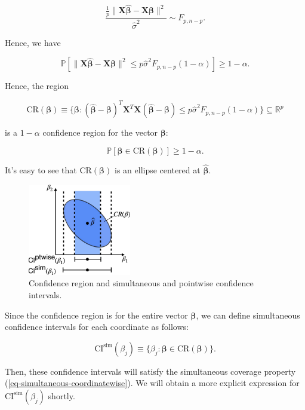 \documentclass[
  11pt,
  letterpaper,
  oneside]{book}
\theoremstyle{definition}
\theoremstyle{plain}
\theoremstyle{plain}
\theoremstyle{plain}
\theoremstyle{remark}
\begin{document}
\[
\frac{\frac{1}{p}\|\boldsymbol{X} \boldsymbol{\widehat{\beta}} - \boldsymbol{X} \boldsymbol{\beta}\|^2}{\widehat{\sigma}^2} \sim F_{p, n-p}.
\]

Hence, we have

\[
\mathbb{P}[\|\boldsymbol{X} \boldsymbol{\widehat{\beta}} - \boldsymbol{X} \boldsymbol{\beta}\|^2 \leq p \widehat{\sigma}^2 F_{p, n-p}(1-\alpha)] \geq 1-\alpha.
\]

Hence, the region

\[
\text{CR}(\boldsymbol{\beta}) \equiv \{\boldsymbol{\beta}: (\boldsymbol{\widehat{\beta}} - \boldsymbol{\beta})^T \boldsymbol{X}^T \boldsymbol{X} (\boldsymbol{\widehat{\beta}} - \boldsymbol{\beta})  \leq p \widehat{\sigma}^2 F_{p, n-p}(1-\alpha)\} \subseteq \mathbb{R}^p
\]

is a \(1-\alpha\) confidence region for the vector
\(\boldsymbol{\beta}\):

\[
\mathbb{P}[\boldsymbol{\beta} \in \text{CR}(\boldsymbol{\beta})] \geq 1-\alpha.
\]

It's easy to see that \(\text{CR}(\boldsymbol{\beta})\) is an ellipse
centered at \(\boldsymbol{\widehat{\beta}}\).

\begin{figure}

{\centering \includegraphics[width=0.4\textwidth,height=\textheight]{figures/confidence-regions.jpg}

}

\caption{\label{fig-confidence-region}Confidence region and simultaneous
and pointwise confidence intervals.}

\end{figure}

Since the confidence region is for the entire vector
\(\boldsymbol{\beta}\), we can define simultaneous confidence intervals
for each coordinate as follows:

\[
\text{CI}^{\text{sim}}(\beta_j) \equiv \{\beta_j: \boldsymbol{\beta} \in \text{CR}(\boldsymbol{\beta})\}.
\]

Then, these confidence intervals will satisfy the simultaneous coverage
property (\ref{eq-simultaneous-coordinatewise}). We will obtain a more
explicit expression for \(\text{CI}^{\text{sim}}(\beta_j)\) shortly.
\end{document}
